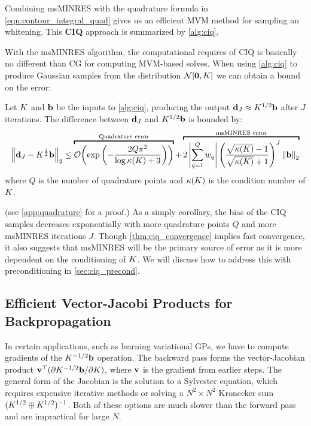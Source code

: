 Combining msMINRES with the quadrature formula in \cref{eqn:contour_integral_quad} gives us an efficient MVM method for sampling an whitening.
This {\bf CIQ} approach is summarized by \cref{alg:ciq}.

With the msMINRES algorithm, the computational requires of CIQ is basically no different than CG for computing MVM-based solves.
When using \cref{alg:ciq} to produce Gaussian samples from the distribution $\normaldist{\bzero}{\bK}$ we can obtain a bound on the error:
%
\begin{theorem}
  Let $K$ and $\mathbf{b}$ be the inputs to \cref{alg:ciq}, producing the output $\mathbf{d}_J \approx K^{1/2} \mathbf{b}$ after $J$ iterations.
  The difference between $\mathbf{d}_J$ and $K^{1/2} \mathbf{b}$ is bounded by:
  \begin{equation}
    \left\Vert \bd_J - \bK^{\frac 1 2} \bb \right\Vert_2
    \leq
    \overbracket{
      \bigo{\exp\left( -\frac{2 Q \pi^2}{\log \kappa(\bK) + 3} \right)}
    }^{\text{Quadrature error}}
    +
    \overbracket{
      2 \left\vert \sum_{q=1}^Q w_q \right\vert
      \left( \frac{ \sqrt{\kappa(\bK)} - 1}{ \sqrt{\kappa(\bK)} + 1} \right)^J
      \left\Vert \bb \right\Vert_2
    }^{\text{msMINRES error}}
  \end{equation}
  where $Q$ is the number of quadrature points and $\kappa(K)$ is the condition number of $K$.
  \label{thm:ciq_convergence}
\end{theorem}
%
(see \cref{app:quadrature} for a proof.)
As a simply corollary, the bias of the CIQ samples decreases exponentially with more quadrature points $Q$ and more msMINRES iterations $J$.
Though \cref{thm:ciq_convergence} implies fast convergence, it also suggests that msMINRES will be the primary source of error as it is more dependent on the conditioning of $K$.
We will discuss how to address this with preconditioning in \cref{sec:ciq_precond}.




\subsection{Efficient Vector-Jacobi Products for Backpropagation}

In certain applications, such as learning variational GPs, we have to compute gradients of the $K^{-1/2} \mathbf{b}$ operation.
The backward pass forms the vector-Jacobian product $\mathbf{v}^\top ( \partial K^{-1/2} \mathbf{b} / \partial K)$, where $\mathbf{v}$ is the gradient from earlier steps.
The general form of the Jacobian is the solution to a Sylvester equation, which requires expensive iterative methods or solving a $N^2 \times N^2$ Kronecker sum $(K^{1/2} \oplus K^{1/2})^{-1}$.
Both of these options are much slower than the forward pass and are impractical for large $N$.

